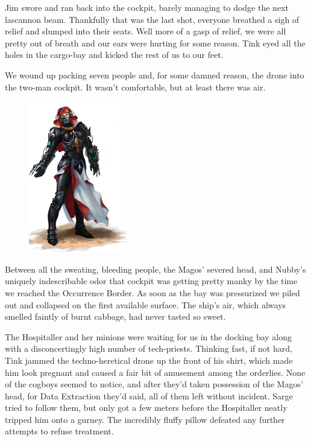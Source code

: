 Jim swore and ran back into the cockpit, barely managing to dodge the next lascannon beam. 
Thankfully that was the last shot, everyone breathed a sigh of relief and slumped into their seats. 
Well more of a gasp of relief, we were all pretty out of breath and our ears were hurting for some reason. 
Tink eyed all the holes in the cargo-bay and kicked the rest of us to our feet.

We wound up packing seven people and, for some damned reason, the drone into the two-man cockpit. 
It wasn't comfortable, but at least there was air.

\begin{figure}
	\begin{center}
		\includegraphics[width=\figwidth]{pics/11/29.png}
	\end{center}
\end{figure}
Between all the sweating, bleeding people, the Magos' severed head, and Nubby's uniquely indescribable odor that cockpit was getting pretty manky by the time we reached the Occurrence Border. 
As soon as the bay was pressurized we piled out and collapsed on the first available surface. 
The ship's air, which always smelled faintly of burnt cabbage, had never tasted so sweet.

The Hospitaller and her minions were waiting for us in the docking bay along with a disconcertingly high number of tech-priests. 
Thinking fast, if not hard, Tink jammed the techno-heretical drone up the front of his shirt, which made him look pregnant and caused a fair bit of amusement among the orderlies. 
None of the cogboys seemed to notice, and after they'd taken possession of the Magos' head, for Data Extraction they'd said, all of them left without incident. 
Sarge tried to follow them, but only got a few meters before the Hospitaller neatly tripped him onto a gurney. 
The incredibly fluffy pillow defeated any further attempts to refuse treatment.

